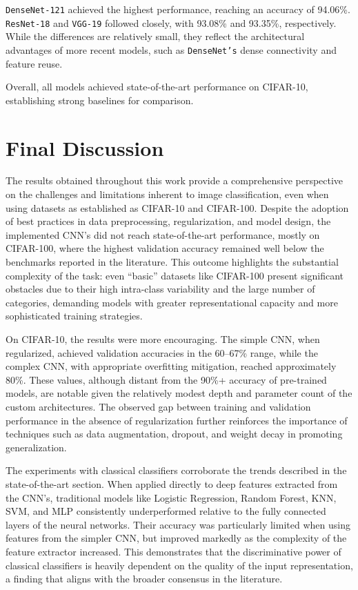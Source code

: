 \documentclass[journal,article,submit,pdftex,moreauthors]{Definitions/mdpi}
\begin{document}
\texttt{DenseNet-121} achieved the highest performance, reaching an accuracy of 94.06\%. \texttt{ResNet-18} and \texttt{VGG-19} followed closely, with 93.08\% and 93.35\%, respectively. While the differences are relatively small, they reflect the architectural advantages of more recent models, such as \texttt{DenseNet’s} dense connectivity and feature reuse.

Overall, all models achieved state-of-the-art performance on CIFAR-10, establishing strong baselines for comparison.

\section{Final Discussion}
\label{sec:final_discussion}

The results obtained throughout this work provide a comprehensive perspective on the challenges and limitations inherent to image classification, even when using datasets as established as CIFAR-10 and CIFAR-100. Despite the adoption of best practices in data preprocessing, regularization, and model design, the implemented CNN's did not reach state-of-the-art performance, mostly on CIFAR-100, where the highest validation accuracy remained well below the benchmarks reported in the literature. This outcome highlights the substantial complexity of the task: even “basic” datasets like CIFAR-100 present significant obstacles due to their high intra-class variability and the large number of categories, demanding models with greater representational capacity and more sophisticated training strategies.

On CIFAR-10, the results were more encouraging. The simple CNN, when regularized, achieved validation accuracies in the 60–67\% range, while the complex CNN, with appropriate overfitting mitigation, reached approximately 80\%. These values, although distant from the 90\%+ accuracy of pre-trained models, are notable given the relatively modest depth and parameter count of the custom architectures. The observed gap between training and validation performance in the absence of regularization further reinforces the importance of techniques such as data augmentation, dropout, and weight decay in promoting generalization.

The experiments with classical classifiers corroborate the trends described in the state-of-the-art section. When applied directly to deep features extracted from the CNN's, traditional models like Logistic Regression, Random Forest, KNN, SVM, and MLP consistently underperformed relative to the fully connected layers of the neural networks. Their accuracy was particularly limited when using features from the simpler CNN, but improved markedly as the complexity of the feature extractor increased. This demonstrates that the discriminative power of classical classifiers is heavily dependent on the quality of the input representation, a finding that aligns with the broader consensus in the literature.
\end{document}
